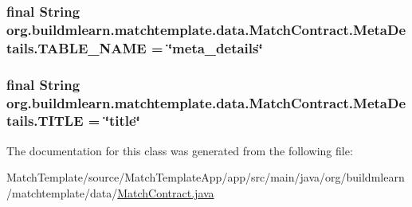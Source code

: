 \subsubsection[{\texorpdfstring{T\+A\+B\+L\+E\+\_\+\+N\+A\+ME}{TABLE_NAME}}]{\setlength{\rightskip}{0pt plus 5cm}final String org.\+buildmlearn.\+matchtemplate.\+data.\+Match\+Contract.\+Meta\+Details.\+T\+A\+B\+L\+E\+\_\+\+N\+A\+ME = \char`\"{}meta\+\_\+details\char`\"{}\hspace{0.3cm}{\ttfamily [static]}}\hypertarget{classorg_1_1buildmlearn_1_1matchtemplate_1_1data_1_1MatchContract_1_1MetaDetails_a5aacda813308d069f9225434274cdf83}{}\label{classorg_1_1buildmlearn_1_1matchtemplate_1_1data_1_1MatchContract_1_1MetaDetails_a5aacda813308d069f9225434274cdf83}
\subsubsection[{\texorpdfstring{T\+I\+T\+LE}{TITLE}}]{\setlength{\rightskip}{0pt plus 5cm}final String org.\+buildmlearn.\+matchtemplate.\+data.\+Match\+Contract.\+Meta\+Details.\+T\+I\+T\+LE = \char`\"{}title\char`\"{}\hspace{0.3cm}{\ttfamily [static]}}\hypertarget{classorg_1_1buildmlearn_1_1matchtemplate_1_1data_1_1MatchContract_1_1MetaDetails_a7700c6e3701a1af4f64803ddaa60231c}{}\label{classorg_1_1buildmlearn_1_1matchtemplate_1_1data_1_1MatchContract_1_1MetaDetails_a7700c6e3701a1af4f64803ddaa60231c}


The documentation for this class was generated from the following file\+:\begin{DoxyCompactItemize}
\item 
Match\+Template/source/\+Match\+Template\+App/app/src/main/java/org/buildmlearn/matchtemplate/data/\hyperlink{MatchContract_8java}{Match\+Contract.\+java}\end{DoxyCompactItemize}
